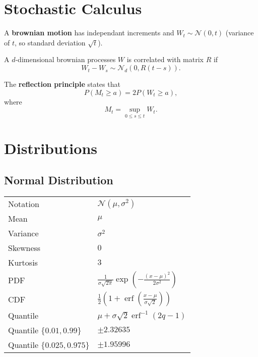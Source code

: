 \documentclass[10pt]{article}
\newcommand{\normal}{\mathscr{N}}
\DeclareMathOperator{\erf}{erf}
\begin{document}
\section{Stochastic Calculus}

\begin{outline}
  \1 A \textbf{brownian motion} has independant increments and $W_t \sim \normal(0,t)$
  (variance of $t$, so standard deviation $\sqrt{t}$).

  \1 A $d$-dimensional brownian processes $W$ is correlated with matrix $R$ if
  \begin{equation*}
    W_t - W_s \sim \normal_d(0, R(t-s)).
  \end{equation*}


  \1 The \textbf{reflection principle} states that 
  \begin{equation*}
    P(M_t \geq a) = 2P(W_t \geq a),
  \end{equation*}
  where 
  \begin{equation*}
    M_t = \sup_{0\leq s \leq t} W_t.
  \end{equation*}
\end{outline}

\section{Distributions}

\subsection{Normal Distribution}

\begin{center}
\begin{tabular}{ll} \toprule
  Notation & $\mathscr{N}(\mu,\sigma^2)$\\
  Mean & $\mu$\\
  Variance & $\sigma^2$\\
  Skewness & $0$\\
  Kurtosis & $3$\\
  PDF & $\displaystyle
        \frac{1}{\sigma\sqrt{2\pi}}\exp\left(-\frac{(x-\mu)^2}{2\sigma^2}\right)$\\
  CDF & $\displaystyle
        \frac{1}{2}\left(1+\erf\left(\frac{x-\mu}{\sigma\sqrt{2}}\right)\right)$\\
  Quantile & $\mu + \sigma\sqrt{2}\erf^{-1}(2q-1)$\\
  Quantile $\{0.01,0.99\}$ & $\pm 2.32635$\\
  Quantile $\{0.025,0.975\}$ & $\pm 1.95996$\\
  \bottomrule
\end{tabular}
\end{center}
\end{document}

